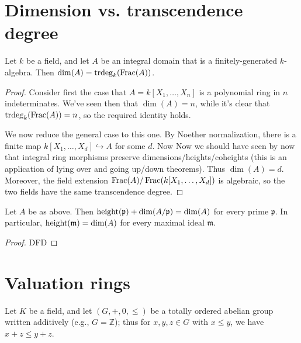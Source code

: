 \documentclass[10pt]{article}
\DeclareMathOperator{\trdeg}{trdeg}
\begin{document}
\section{Dimension vs. transcendence degree}
\label{sec:org12a4f19}



\begin{theorem}
Let $k$ be a field,
and let $A$ be an integral domain
that is a finitely-generated $k$-algebra.
Then $\dim( A) = \trdeg_k (\Frac(A))$.
\end{theorem}
\begin{proof}
  Consider first the case
  that $A = k[X_1,\dotsc,X_n]$ is a polynomial ring
  in $n$ indeterminates.
  We've seen then that $\dim(A) = n$,
  while it's clear that $\trdeg_k (\Frac(A)) = n$,
  so the required identity holds.

  We now reduce the general case to this one.  By Noether
  normalization, there is a finite map
  $k[X_1,\dotsc,X_d] \hookrightarrow A$ for some $d$.  Now Now
  we should have seen by now that integral ring morphisms
  preserve dimensions/heights/coheights (this is an application
  of lying over and going up/down theorems).  Thus
  $\dim(A) = d$.  Moreover, the field extension
  $\operatorname{Frac}(A) / \operatorname{Frac}(k[X_1,\dotsc,X_d])$ is algebraic, so the two
  fields have the same transcendence degree.
\end{proof}

\begin{theorem}
  Let $A$ be as above.
  Then $\operatorname{height}(\mathfrak{p}) + \dim(A/\mathfrak{p}) = \dim(A)$
  for every prime $\mathfrak{p}$.
  In particular,
  $\operatorname{height}(\mathfrak{m}) = \dim(A)$ for every maximal ideal $\mathfrak{m}$.
\end{theorem}
\begin{proof}
  DFD
\end{proof}


\section{Valuation rings}
\label{sec:orgd85e6aa}

Let \(K\) be a field,
and let \((G, +, 0, \leq)\) be a totally ordered abelian group written additively
(e.g., \(G = \mathbb{Z}\));
thus for \(x,y,z \in G\) with \(x \leq y\), we have \(x + z \leq y +
  z\).
\end{document}
